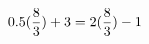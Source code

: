 \documentclass[preview]{standalone}
\begin{document}
\begin{align*}
\special{dvisvgm:raw <g id='unique000'>}0.5(\frac{8}{3}) + 3 = 2(\frac{8}{3}) - 1\special{dvisvgm:raw </g>}
\end{align*}
\end{document}
